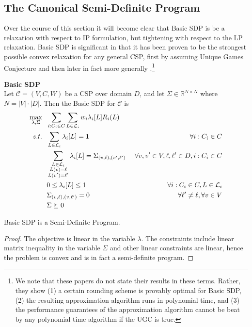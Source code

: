 \subsection{The Canonical Semi-Definite Program}

Over the course of this section it will become clear that Basic SDP is be a relaxation with respect to IP formulation, but tightening with respect to the LP relaxation. Basic SDP is significant in that it has been proven to be the strongest possible convex relaxation for any general CSP, first by assuming Unique Games Conjecture \cite{Rag08} and then later in fact more generally \cite{nphard}.\footnote{We note that these papers do not state their results in these terms. Rather, they show (1) a certain rounding scheme is provably optimal for Basic SDP, (2) the resulting approximation algorithm runs in polynomial time, and (3) the performance guarantees of the approximation algorithm cannot be beat by any polynomial time algorithm if the UGC is true.}

\begin{definition}\textbf{Basic SDP} \\
Let $\mathcal{C} = (V,C,W)$ be a CSP over domain $D$, and let $\Sigma \in \mathbb{R}^{N \times N}$ where $N = |V| \cdot |D|$. Then the Basic SDP for $\mathcal{C}$ is
\begin{alignat}{2}
\max_{\lambda, \Sigma} ~&~ \sum_{i : C_i \in C} \sum_{L \in \mathcal{L}_i}   w_i\lambda_i[L] R_i(L) & \\
s.t. ~ & ~ \sum_{L \in \mathcal{L}_i} \lambda_i[L] = 1  & \forall i : C_i \in C \label{eq:SDPlambdaSum} \\
     ~ & ~ \sum_{\substack {L\in \mathcal{L}_{i}\\ L(v) = \ell\\ L(v')=\ell'} }\lambda_{i}[L]  = \Sigma_{\left(v, \ell\right),\left(v', \ell'\right)}  &~\forall v,v' \in V, \ell,\ell' \in D, i : C_i \in C \label{eq:SDPtiePSD}\\
     ~ & ~ 0 \leq \lambda_i[L] \leq 1  & \forall  i : C_i \in C, L \in \mathcal{L}_i  \label{eq:SDPlambdaNonNeg} \\ 
     ~& ~ \Sigma_{\left(v, \ell\right),\left(v, \ell'\right)} = 0 & \forall \ell' \neq \ell,  \forall v \in V\\
     ~ & ~ \Sigma \succeq 0& \label{eq:SDPPSD}
\end{alignat} \label{def:BasicSDP}
\end{definition}

\begin{theorem}
Basic SDP is a Semi-Definite Program.
\end{theorem}
\begin{proof}
The objective is linear in the variable $\lambda$. The constraints include linear matrix inequality in the variable $\Sigma$ and other linear constraints are linear, hence the problem is convex and is in fact a semi-definite program.
\end{proof}


